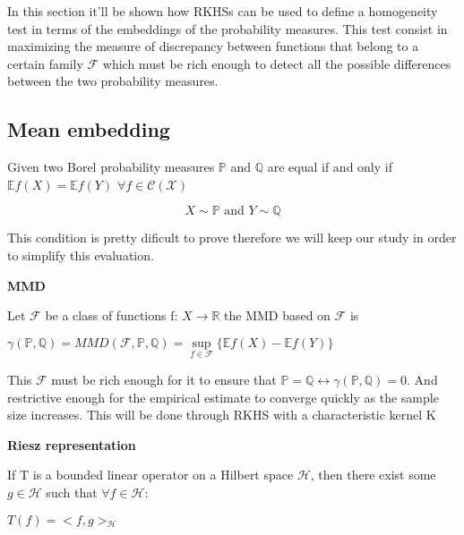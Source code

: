 In this section it'll be shown how RKHSs can be used to define a homogeneity test in terms of the embeddings of the probability measures.
This test consist in maximizing the measure of discrepancy between functions that belong to a certain family $\mathcal{F}$ which must be rich enough to detect all the possible differences between the two probability measures.
\subsection{Mean embedding}


Given two Borel probability measures $\mathbb{P}$ and $\mathbb{Q}$  are equal if and only if $\mathbb{E}f(X) = \mathbb{E}f(Y)$  $\forall f \in \mathcal{C(X)}$

$$X \sim \mathbb{P} \text{ and } Y \sim \mathbb{Q}$$

\begin{flushleft}
This condition is pretty dificult to prove therefore we will keep our study in order to simplify this evaluation.
\end{flushleft}

\begin{defn}\textsf{\textbf{MMD}}

Let $\mathcal{F}$ be a class of functions f: $X \rightarrow \mathbb{R}$ the MMD based on $\mathcal{F}$ is

\end{defn}
\begin{center}
$\gamma(\mathbb{P},\mathbb{Q}) = MMD(\mathcal{F},\mathbb{P},\mathbb{Q}) =  \sup\limits_{f\in\mathcal{F}}\{\mathbb{E}f(X) -\mathbb{E}f(Y)\}$
\end{center}
\begin{flushleft}
This $\mathcal{F}$ must be rich enough for it to ensure that $\mathbb{P} = \mathbb{Q} \leftrightarrow \gamma(\mathbb{P},\mathbb{Q}) = 0$. And restrictive enough for the empirical estimate to converge quickly as the sample size increases.
This will be done through RKHS with a characteristic kernel K
\end{flushleft}
\begin{defn}
\textsf{\textbf{Riesz representation}}
\begin{flushleft}
If T is a bounded linear operator on a Hilbert space $\mathcal{H}$, then there exist some $g \in \mathcal{H}$ such that $\forall f \in \mathcal{H}$:
\end{flushleft}
\begin{center}
$T(f) = <f,g>_{\mathcal{H}}$
\end{center}
\end{defn}

